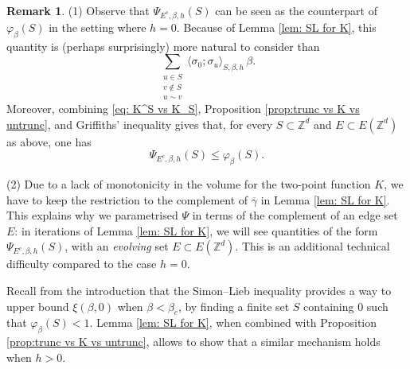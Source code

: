 \documentclass[11pt,a4paper]{article}
\numberwithin{equation}{section}
\theoremstyle{plain}
\theoremstyle{definition}
\newtheorem{Rem}[Thm]{Remark}
\begin{document}
\begin{Rem}\label{rem:comp psi phi}
(1) Observe that $\Psi_{E^c,\beta,h}(S)$ can be seen as the counterpart of $\varphi_\beta(S)$ in the setting where $h=0$. Because of Lemma \ref{lem: SL for K}, this quantity is (perhaps surprisingly) more natural to consider than 
\begin{equation}
	\sum_{\substack{u\in S\\v\notin S\\u \sim v}}\langle \sigma_0;\sigma_u\rangle_{S,\beta,h}\, \beta.
\end{equation}
Moreover, combining \eqref{eq: K^S vs K_S}, Proposition \ref{prop:trunc vs K vs untrunc}, and Griffiths' inequality gives that, for every $S\subset \mathbb Z^d$ and $E\subset E(\mathbb Z^d)$ as above, one has
\begin{equation}\label{eq:BOUND PSI BY PHI}
	\Psi_{E^c,\beta,h}(S)\leq \varphi_\beta(S).
\end{equation}
%
%


(2) Due to a lack of monotonicity in the volume for the two-point function $K$, we have to keep the restriction to the complement of $\overline{\gamma}$ in Lemma \ref{lem: SL for K}. This explains why we parametrised $\Psi$ in terms of the complement of an edge set $E$: in iterations of Lemma \ref{lem: SL for K}, we will see quantities of the form $\Psi_{E^c,\beta,h}(S)$, with an \emph{evolving} set $E\subset E(\mathbb Z^d)$. This is an additional technical difficulty compared to the case $h=0$.
\end{Rem}

Recall from the introduction that the Simon--Lieb inequality provides a way to upper bound $\xi(\beta,0)$ when $\beta<\beta_c$, by finding a finite set $S$ containing $0$ such that $\varphi_\beta(S)<1$. Lemma \ref{lem: SL for K}, when combined with Proposition \ref{prop:trunc vs K vs untrunc}, allows to show that a similar mechanism holds when $h>0$.
\end{document}

